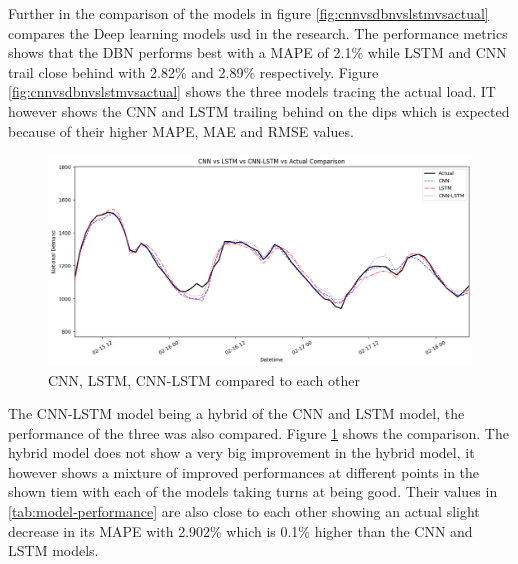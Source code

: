  Further in the comparison of the models in figure \ref{fig:cnnvsdbnvslstmvsactual} compares the Deep learning models usd in the research. The performance metrics shows that the DBN performs best with a MAPE of 2.1\% while LSTM and CNN trail close behind with 2.82\% and 2.89\% respectively. Figure \ref{fig:cnnvsdbnvslstmvsactual} shows the three models tracing the actual load. IT however shows the CNN and LSTM trailing behind on the dips which is expected because of their higher MAPE, MAE and RMSE values.
  \begin{figure}[h!]
 	\centering
 	\includegraphics[width=0.75\linewidth]{Chapters/images/results/cnn_vs_lstm_vs_cnn-lstm_vs_actual}
 	\caption{CNN, LSTM, CNN-LSTM compared to each other}
 	\label{fig:cnnvslstmvscnn-lstmvsactual}
 \end{figure}
 
The CNN-LSTM model being a hybrid of the CNN and LSTM model, the performance of the three was also compared. Figure \ref{fig:cnnvslstmvscnn-lstmvsactual} shows the comparison. The hybrid model does not show a very big improvement in the hybrid model, it however shows a mixture of improved performances at different points in the shown tiem with each of the models taking turns at being good. Their values in \ref{tab:model-performance} are also close to each other showing an actual slight decrease in its MAPE with 2.902\% which is 0.1\% higher than the CNN and LSTM models.
 
